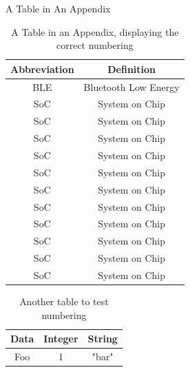 \documentclass{workreport}
\begin{document}

\begin{backmatter}


\begin{appendix}{A Table in An Appendix}

        \lipsum[1-2]

    \begin{table}
		\centering

		\begin{tabular}{|c|c|} \hline
			\textbf{Abbreviation} & \textbf{Definition} \\ \hline
			BLE & Bluetooth Low Energy \\ \hline
			SoC & System on Chip \\ \hline
			SoC & System on Chip \\ \hline
			SoC & System on Chip \\ \hline
			SoC & System on Chip \\ \hline
			SoC & System on Chip \\ \hline
			SoC & System on Chip \\ \hline
			SoC & System on Chip \\ \hline
			SoC & System on Chip \\ \hline
			SoC & System on Chip \\ \hline
			SoC & System on Chip \\ \hline
			SoC & System on Chip \\ \hline
		\end{tabular}

		\caption{A Table in an Appendix, displaying the correct numbering}
        \end{table}

	\begin{table}
		\centering
		\begin{tabular}{|c|c|c|} \hline
			\textbf{Data} & \textbf{Integer} & \textbf{String} \\ \hline
			Foo & 1 & "bar" \\ \hline
		\end{tabular}
		\caption{Another table to test numbering}
	\end{table}

\end{appendix}

\end{backmatter}
\end{document}
